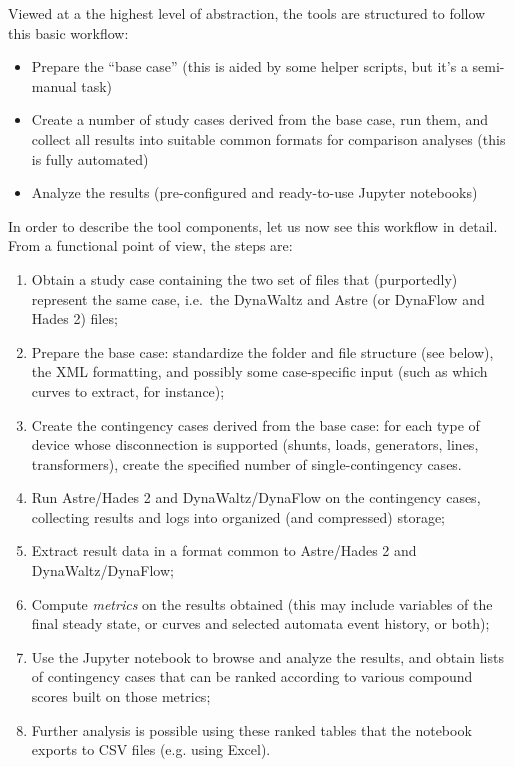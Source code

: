 \documentclass[conference]{IEEEtran}
\begin{document}
Viewed at a the highest level of abstraction, the tools are structured
to follow this basic workflow:
\begin{itemize}
\item Prepare the ``base case'' (this is aided by some helper scripts,
  but it's a semi-manual task)
\item Create a number of study cases derived from the base case, run
  them, and collect all results into suitable common formats for
  comparison analyses (this is fully automated)
\item Analyze the results (pre-configured and ready-to-use Jupyter
  notebooks)
\end{itemize}
In order to describe the tool components, let us now see this workflow
in detail. From a functional point of view, the steps are:
\begin{enumerate}
  \item Obtain a study case containing the two set of files that
    (purportedly) represent the same case, i.e.~the DynaWaltz and
    Astre (or DynaFlow and Hades 2) files;
  \item Prepare the base case: standardize the folder and file
    structure (see below), the XML formatting, and possibly some
    case-specific input (such as which curves to extract, for
    instance);
  \item Create the contingency cases derived from the base case: for
    each type of device whose disconnection is supported (shunts,
    loads, generators, lines, transformers), create the specified
    number of single-contingency cases.
  \item Run Astre/Hades 2 and DynaWaltz/DynaFlow on the contingency
    cases, collecting results and logs into organized (and compressed)
    storage;
  \item Extract result data in a format common to Astre/Hades 2 and
    DynaWaltz/DynaFlow;
  \item Compute \emph{metrics} on the results obtained (this may
    include variables of the final steady state, or curves and
    selected automata event history, or both);
  \item Use the Jupyter notebook to browse and analyze the results,
    and obtain lists of contingency cases that can be ranked according
    to various compound scores built on those metrics;
  \item Further analysis is possible using these ranked tables that
    the notebook exports to CSV files (e.g. using Excel).
\end{enumerate}
\end{document}
